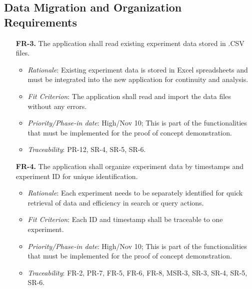 \documentclass[12pt]{article}
\begin{document}
\subsection{Data Migration and Organization Requirements}
  \begin{enumerate}
    \item[\textbf{FR-3.}] The application shall read existing experiment data stored in .CSV files.
    \begin{itemize}
      \item \textit{Rationale}: Existing experiment data is stored in Excel spreadsheets and must be integrated into the new application for continuity and analysis.
      \item \textit{Fit Criterion}: The application shall read and import the data files without any errors.
      \item \textit{Priority/Phase-in date}: High/Nov 10; This is part of the functionalities that must be implemented for the proof of concept demonstration.
      \item \textit{Traceability}: PR-12, SR-4, SR-5, SR-6.
    \end{itemize}
    \item[\textbf{FR-4.}] The application shall organize experiment data by timestamps and experiment ID for unique identification.
    \begin{itemize}
      \item \textit{Rationale}: Each experiment needs to be separately identified for quick retrieval of data and efficiency in search or query actions.
      \item \textit{Fit Criterion}: Each ID and timestamp shall be traceable to one experiment.
      \item \textit{Priority/Phase-in date}: High/Nov 10; This is part of the functionalities that must be implemented for the proof of concept demonstration.
      \item \textit{Traceability}: FR-2, PR-7, FR-5, FR-6, FR-8, MSR-3, SR-3, SR-4, SR-5, SR-6.
    \end{itemize}
  \end{enumerate}
\end{document}
